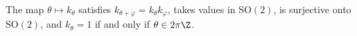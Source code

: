 The map $\theta\mapsto k_\theta$ satisfies $k_{\theta+\varphi}=k_\theta k_\varphi$, takes values in $\mathrm{SO}(2)$, is surjective onto $\mathrm{SO}(2)$, and $k_\theta=1$ if and only if $\theta\in2\pi\Z$.
